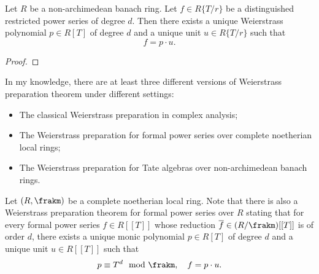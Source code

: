     \begin{theorem}\label{thm:Weierstrass_preparation_theorem_Tate_algebra}
        Let \(R\) be a non-archimedean banach ring.
        Let \(f \in R\{T/r\}\) be a distinguished restricted power series of degree \(d\).
        Then there exists a unique Weierstrass polynomial \(p \in R[T]\) of degree \(d\) and a unique unit \(u \in R\{T/r\}\) such that
        \[ f = p \cdot u. \]
    \end{theorem}
    \begin{proof}
    \end{proof}


    \begin{remark}\label{rmk:Weierstrass_preparation_in_complex_formal_and_Tate_settings}
        In my knowledge, there are at least three different versions of Weierstrass preparation theorem under different settings:
        \begin{itemize}
            \item The classical Weierstrass preparation in complex analysis;
            \item The Weierstrass preparation for formal power series over complete noetherian local rings;
            \item The Weierstrass preparation for Tate algebras over non-archimedean banach rings.
        \end{itemize}


        Let \((R,\frakm)\) be a complete noetherian local ring.
        Note that there is also a Weierstrass preparation theorem for formal power series over \(R\) stating that 
        for every formal power series \(f \in R[[T]]\) whose reduction \(\overline{f} \in (R/\frakm)[[T]]\) is of order \(d\), 
        there exists a unique monic polynomial \(p \in R[T]\) of degree \(d\) and a unique unit \(u \in R[[T]]\) such that
        \[ p \equiv T^d \mod \frakm, \quad f = p \cdot u. \]

    \end{remark}

